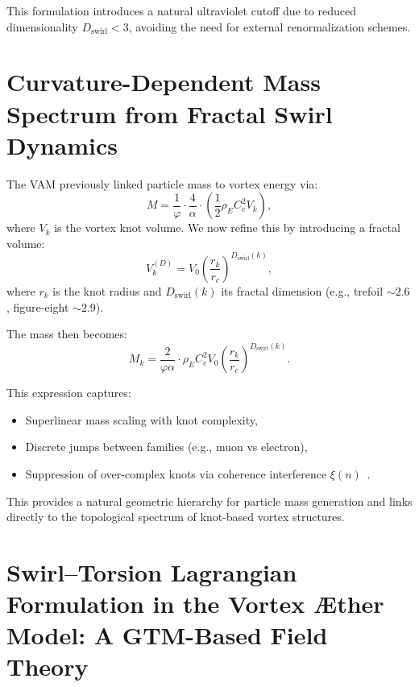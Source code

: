 \documentclass[11pt]{article}
\begin{document}
    This formulation introduces a natural ultraviolet cutoff due to reduced dimensionality \( D_\text{swirl} < 3 \), avoiding the need for external renormalization schemes.

    \section{Curvature-Dependent Mass Spectrum from Fractal Swirl Dynamics}

    The VAM previously linked particle mass to vortex energy via:
    \[
        M = \frac{1}{\varphi} \cdot \frac{4}{\alpha} \cdot \left( \frac{1}{2} \rho_{\scriptscriptstyle\boldsymbol\!E}C_e^2 V_k \right),
    \]
    where \( V_k \) is the vortex knot volume. We now refine this by introducing a fractal volume:
    \[
        V_k^{(D)} = V_0 \left( \frac{r_k}{r_c} \right)^{D_\text{swirl}(k)},
    \]
    where \( r_k \) is the knot radius and \( D_\text{swirl}(k) \) its fractal dimension (e.g., trefoil \( \sim 2.6 \), figure-eight \( \sim 2.9 \)).

    The mass then becomes:
    \[
        M_k = \frac{2}{\varphi \alpha} \cdot \rho_{\scriptscriptstyle\boldsymbol\!E}C_e^2 V_0 \left( \frac{r_k}{r_c} \right)^{D_\text{swirl}(k)}.
    \]

    This expression captures:
    \begin{itemize}
        \item Superlinear mass scaling with knot complexity,
        \item Discrete jumps between families (e.g., muon vs electron),
        \item Suppression of over-complex knots via coherence interference \( \xi(n) \)~\cite{vam2024mass}.
    \end{itemize}

    This provides a natural geometric hierarchy for particle mass generation and links directly to the topological spectrum of knot-based vortex structures.



    \section{Swirl--Torsion Lagrangian Formulation in the Vortex \AE ther Model: A GTM-Based Field Theory}
\end{document}
